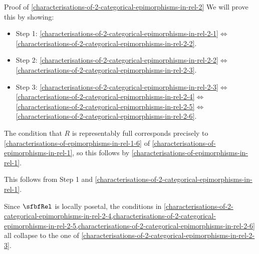 \begin{Proof}{Proof of \cref{characterisations-of-2-categorical-epimorphisms-in-rel-2}}%
    We will prove this by showing:
    \begin{itemize}
        \item Step 1: \cref{characterisations-of-2-categorical-epimorphisms-in-rel-2-1}$\iff$\cref{characterisations-of-2-categorical-epimorphisms-in-rel-2-2}.
        \item Step 2: \cref{characterisations-of-2-categorical-epimorphisms-in-rel-2-2}$\iff$\cref{characterisations-of-2-categorical-epimorphisms-in-rel-2-3}.
        \item Step 3: \cref{characterisations-of-2-categorical-epimorphisms-in-rel-2-3}$\iff$\cref{characterisations-of-2-categorical-epimorphisms-in-rel-2-4}$\iff$\cref{characterisations-of-2-categorical-epimorphisms-in-rel-2-5}$\iff$\cref{characterisations-of-2-categorical-epimorphisms-in-rel-2-6}.
    \end{itemize}

    The condition that $R$ is representably full corresponds precisely to \cref{characterisations-of-epimorphisms-in-rel-1-6} of \cref{characterisations-of-epimorphisms-in-rel-1}, so this follows by \cref{characterisations-of-epimorphisms-in-rel-1}.

    This follows from Step 1 and \cref{characterisations-of-2-categorical-epimorphisms-in-rel-1}.

    Since $\sfbfRel$ is locally posetal, the conditions in \cref{characterisations-of-2-categorical-epimorphisms-in-rel-2-4,characterisations-of-2-categorical-epimorphisms-in-rel-2-5,characterisations-of-2-categorical-epimorphisms-in-rel-2-6} all collapse to the one of \cref{characterisations-of-2-categorical-epimorphisms-in-rel-2-3}.
\end{Proof}

